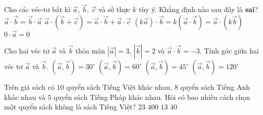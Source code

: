 \begin{ex}%
Cho các véc-tơ bất kì $\overrightarrow{a}$, $\overrightarrow{b}$, $\overrightarrow{c}$ và số thực $k$ tùy ý. Khẳng định nào sau đây là {\bf sai}?
\choice
{$\overrightarrow{a}\cdot \overrightarrow{b}=\overrightarrow{b}\cdot \overrightarrow{a}$}
{$\overrightarrow{a}\cdot \left(\overrightarrow{b}+\overrightarrow{c}\right)=\overrightarrow{a}\cdot \overrightarrow{b}+\overrightarrow{a}\cdot \overrightarrow{c}$}
{$\left(k\overrightarrow{a}\right)\cdot \overrightarrow{b}=k\left(\overrightarrow{a}\cdot \overrightarrow{b}\right)=\overrightarrow{a}\cdot \left(k\overrightarrow{b}\right)$}
{\True $0\cdot \overrightarrow{a}=0$}
\end{ex}

\begin{ex}%
Cho hai véc tơ $\overrightarrow{a}$ và $\overrightarrow{b}$ thỏa mãn $\left|\overrightarrow{a}\right|=3$, $\left|\overrightarrow{b}\right|=2$ và $\overrightarrow{a}\cdot \overrightarrow{b}=-3$. Tính góc giữa hai véc tơ $\overrightarrow{a}$ và $\overrightarrow{b}$.
\choice
{$\left(\overrightarrow{a},\overrightarrow{b}\right)=30^{\circ}$}
{$\left(\overrightarrow{a},\overrightarrow{b}\right)=60^{\circ}$}
{$\left(\overrightarrow{a},\overrightarrow{b}\right)=45^{\circ}$}
{\True $\left(\overrightarrow{a},\overrightarrow{b}\right)=120^{\circ}$}
\end{ex}

\begin{ex}%
Trên giá sách có $10$ quyển sách Tiếng Việt khác nhau, $8$ quyển sách Tiếng Anh khác nhau và $5$ quyển sách Tiếng Pháp khác nhau. Hỏi có bao nhiêu cách chọn một quyển sách không là sách Tiếng Việt?
\choice
{$23$}
{$400$}
{\True $13$}
{$40$}
\end{ex}

